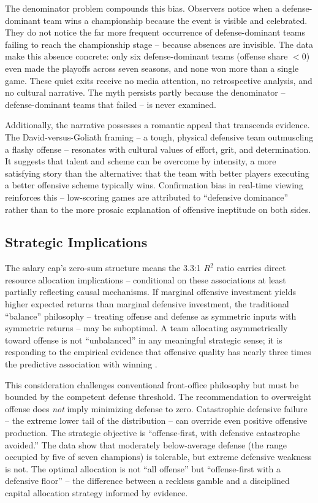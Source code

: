 \documentclass[12pt,a4paper]{article}
\begin{document}
The denominator problem compounds this bias. Observers notice when a defense-dominant team wins a championship because the event is visible and celebrated. They do not notice the far more frequent occurrence of defense-dominant teams failing to reach the championship stage -- because absences are invisible. The data make this absence concrete: only six defense-dominant teams (offense share $< 0$) even made the playoffs across seven seasons, and none won more than a single game. These quiet exits receive no media attention, no retrospective analysis, and no cultural narrative. The myth persists partly because the denominator -- defense-dominant teams that failed -- is never examined.

Additionally, the narrative possesses a romantic appeal that transcends evidence. The David-versus-Goliath framing -- a tough, physical defensive team outmuscling a flashy offense -- resonates with cultural values of effort, grit, and determination. It suggests that talent and scheme can be overcome by intensity, a more satisfying story than the alternative: that the team with better players executing a better offensive scheme typically wins. Confirmation bias in real-time viewing reinforces this -- low-scoring games are attributed to ``defensive dominance'' rather than to the more prosaic explanation of offensive ineptitude on both sides.

\subsection{Strategic Implications}
\label{sec:strategic}

The salary cap's zero-sum structure means the 3.3:1 $R^2$ ratio carries direct resource allocation implications -- conditional on these associations at least partially reflecting causal mechanisms. If marginal offensive investment yields higher expected returns than marginal defensive investment, the traditional ``balance'' philosophy -- treating offense and defense as symmetric inputs with symmetric returns -- may be suboptimal. A team allocating asymmetrically toward offense is not ``unbalanced'' in any meaningful strategic sense; it is responding to the empirical evidence that offensive quality has nearly three times the predictive association with winning \citep{mulholland2019optimizing}.

This consideration challenges conventional front-office philosophy but must be bounded by the competent defense threshold. The recommendation to overweight offense does \emph{not} imply minimizing defense to zero. Catastrophic defensive failure -- the extreme lower tail of the distribution -- can override even positive offensive production. The strategic objective is ``offense-first, with defensive catastrophe avoided.'' The data show that moderately below-average defense (the range occupied by five of seven champions) is tolerable, but extreme defensive weakness is not. The optimal allocation is not ``all offense'' but ``offense-first with a defensive floor'' -- the difference between a reckless gamble and a disciplined capital allocation strategy informed by evidence.
\end{document}
